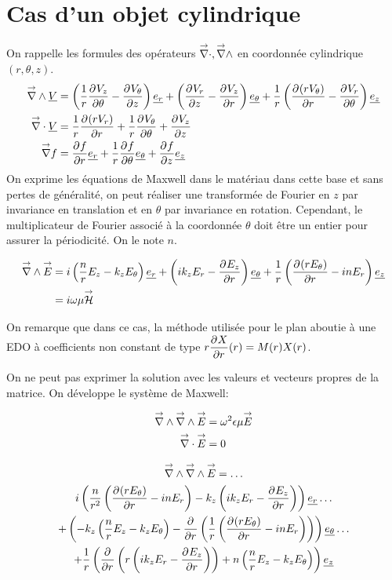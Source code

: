 \section{Cas d'un objet cylindrique}

    On rappelle les formules des opérateurs $\vdiv, \vrot$ en coordonnée cylindrique $(r,\theta,z)$.
    \begin{align}
        \vrot \v{V} &= \left(\frac{1}{r}\ddr{\theta}{V_z} - \ddr{z}{V_\theta}\right)\v{e_r} + 
        \left(\ddr{z}{V_r} - \ddr{r}{V_z}\right)\v{e_\theta} +
        \frac{1}{r}\left(\ddr{r}{(rV_\theta)}-\ddr{\theta}{V_r}\right)\v{e_z} 
        \\
        \vdiv \v{V} &= \frac{1}{r}\ddr{r}{(rV_r)}+\frac{1}{r}\ddr{\theta}{V_\theta}+\ddr{z}{V_z}
        \\
        \vgrad f &= \ddr{r}{f}\v{e_r}
        +\frac{1}{r}\ddr{\theta}{f}\v{e_\theta} + \ddr{z}{f}\v{e_z}
    \end{align}
    On exprime les équations de Maxwell dans le matériau dans cette base et sans pertes de généralité, on peut réaliser une transformée de Fourier en $z$ par invariance en translation et en $\theta$ par invariance en rotation. Cependant, le multiplicateur de Fourier associé à la coordonnée $\theta$ doit être un entier pour assurer la périodicité. On le note $n$.

    \begin{align}
        \vrot \vE &= i\left(\frac{n}{r}E_z - k_zE_\theta\right)\v{e_r} + 
        \left(ik_zE_r - \ddr{r}{E_z}\right)\v{e_\theta} +
        \frac{1}{r}\left(\ddr{r}{(rE_\theta)}-inE_r\right)\v{e_z}
        \\
        &=i\w\mu \vH
    \end{align}

    On remarque que dans ce cas, la méthode utilisée pour le plan aboutie à une EDO à coefficients non constant de type $r\ddr{r}{X}(r) = M(r)X(r)$.

    On ne peut pas exprimer la solution avec les valeurs et vecteurs propres de la matrice. 
    On développe le système de Maxwell:

    \begin{align}
        \vrot \vrot \vE &= \w^2\eps\mu \vE
        \\
        \vdiv \vE &= 0
    \end{align}

    \begin{multline}
        \vrot \vrot \vE = \dots\\
        i\left(\frac{n}{r^2}\left(\ddr{r}{(rE_\theta)} - inE_r\right) - k_z\left(ik_zE_r - \ddr{r}{E_z}\right)\right)    \v{e_r} \dots\\ 
        + \left(-k_z\left(\frac{n}{r}E_z - k_zE_\theta\right) -\ddr{r}{}\left(\frac{1}{r}\left(\ddr{r}{(rE_\theta)}-inE_r\right)\right)\right)    \v{e_\theta} \dots\\
        + \frac{1}{r}\left(\ddr{r}{} \left(r\left(ik_zE_r - \ddr{r}{E_z}\right)\right) + n \left(\frac{n}{r}E_z - k_zE_\theta\right)\right) \v{e_z}
    \end{multline}

